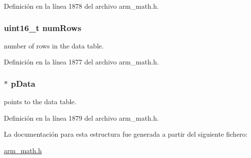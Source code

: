 Definición en la línea 1878 del archivo arm\+\_\+math.\+h.

\subsubsection[{\texorpdfstring{num\+Rows}{numRows}}]{\setlength{\rightskip}{0pt plus 5cm}uint16\+\_\+t num\+Rows}\hypertarget{structarm__bilinear__interp__instance__q15_a1bcf80ccdc2acc29198f1592ae300390}{}\label{structarm__bilinear__interp__instance__q15_a1bcf80ccdc2acc29198f1592ae300390}
number of rows in the data table. 

Definición en la línea 1877 del archivo arm\+\_\+math.\+h.

\subsubsection[{\texorpdfstring{p\+Data}{pData}}]{$\ast$ p\+Data}\hypertarget{structarm__bilinear__interp__instance__q15_a817ede38365e63e561a12069c6c5c087}{}\label{structarm__bilinear__interp__instance__q15_a817ede38365e63e561a12069c6c5c087}
points to the data table. 

Definición en la línea 1879 del archivo arm\+\_\+math.\+h.



La documentación para esta estructura fue generada a partir del siguiente fichero\+:\begin{DoxyCompactItemize}
\item 
\hyperlink{arm__math_8h}{arm\+\_\+math.\+h}\end{DoxyCompactItemize}
